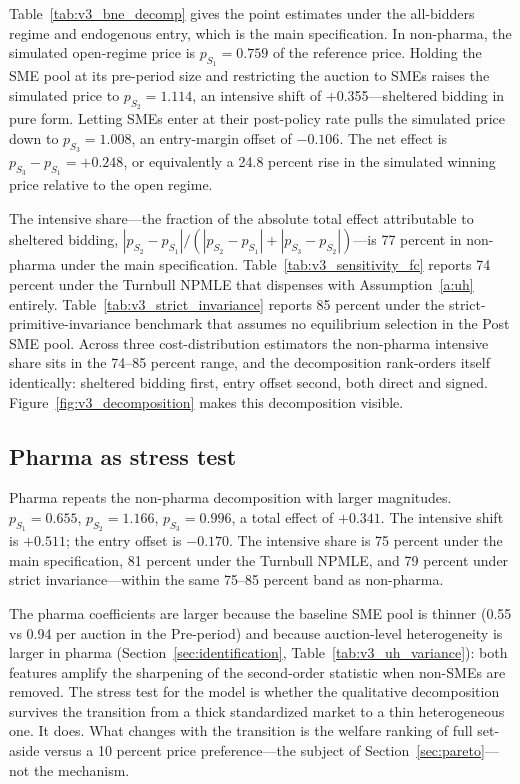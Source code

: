 Table~\ref{tab:v3_bne_decomp} gives the point estimates under the all-bidders regime and endogenous entry, which is the main specification. In non-pharma, the simulated open-regime price is $p_{S_1} = 0.759$ of the reference price. Holding the SME pool at its pre-period size and restricting the auction to SMEs raises the simulated price to $p_{S_2} = 1.114$, an intensive shift of +0.355---sheltered bidding in pure form. Letting SMEs enter at their post-policy rate pulls the simulated price down to $p_{S_3} = 1.008$, an entry-margin offset of $-0.106$. The net effect is $p_{S_3} - p_{S_1} = +0.248$, or equivalently a 24.8 percent rise in the simulated winning price relative to the open regime.

The intensive share---the fraction of the absolute total effect attributable to sheltered bidding, $|p_{S_2} - p_{S_1}| / (|p_{S_2} - p_{S_1}| + |p_{S_3} - p_{S_2}|)$---is 77 percent in non-pharma under the main specification. Table~\ref{tab:v3_sensitivity_fc} reports 74 percent under the Turnbull NPMLE that dispenses with Assumption~\ref{a:uh} entirely. Table~\ref{tab:v3_strict_invariance} reports 85 percent under the strict-primitive-invariance benchmark that assumes no equilibrium selection in the Post SME pool. Across three cost-distribution estimators the non-pharma intensive share sits in the 74--85 percent range, and the decomposition rank-orders itself identically: sheltered bidding first, entry offset second, both direct and signed. Figure~\ref{fig:v3_decomposition} makes this decomposition visible.

\subsection{Pharma as stress test}

Pharma repeats the non-pharma decomposition with larger magnitudes. $p_{S_1} = 0.655$, $p_{S_2} = 1.166$, $p_{S_3} = 0.996$, a total effect of $+0.341$. The intensive shift is $+0.511$; the entry offset is $-0.170$. The intensive share is 75 percent under the main specification, 81 percent under the Turnbull NPMLE, and 79 percent under strict invariance---within the same 75--85 percent band as non-pharma.

The pharma coefficients are larger because the baseline SME pool is thinner (0.55 vs 0.94 per auction in the Pre-period) and because auction-level heterogeneity is larger in pharma (Section~\ref{sec:identification}, Table~\ref{tab:v3_uh_variance}): both features amplify the sharpening of the second-order statistic when non-SMEs are removed. The stress test for the model is whether the qualitative decomposition survives the transition from a thick standardized market to a thin heterogeneous one. It does. What changes with the transition is the welfare ranking of full set-aside versus a 10 percent price preference---the subject of Section~\ref{sec:pareto}---not the mechanism.

